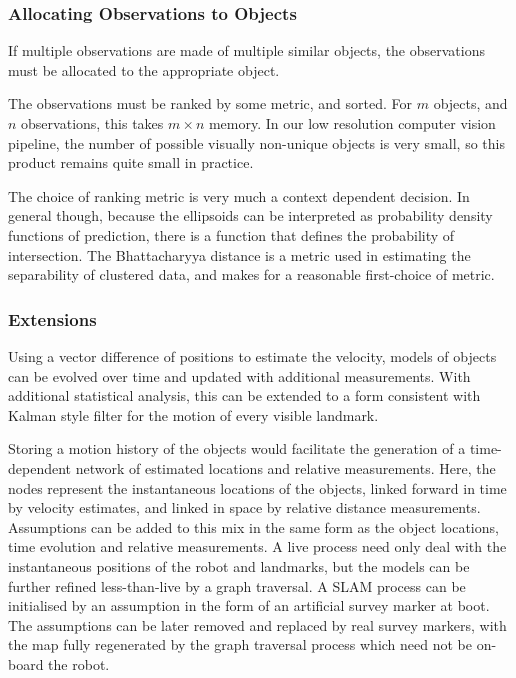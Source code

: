 \documentclass[a4paper, 11pt, titlepage]{article}
\begin{document}
    \subsubsection{Allocating Observations to Objects}
      If multiple observations are made of multiple similar objects, the observations must be allocated to the appropriate object.

      The observations must be ranked by some metric, and sorted.  For \(m\) objects, and \(n\) observations, this takes \(m \times n\) memory.  In our low resolution computer vision pipeline, the number of possible visually non-unique objects is very small, so this product remains quite small in practice.

      The choice of ranking metric is very much a context dependent decision.  In general though, because the ellipsoids can be interpreted as probability density functions of prediction, there is a function that defines the probability of intersection. The Bhattacharyya distance is a metric used in estimating the separability of clustered data, and makes for a reasonable first-choice of metric.

    \subsubsection{Extensions}
      Using a vector difference of positions to estimate the velocity, models of objects can be evolved over time and updated with additional measurements.  With additional statistical analysis, this can be extended to a form consistent with Kalman style filter for the motion of every visible landmark.

      Storing a motion history of the objects would facilitate the generation of a time-dependent network of estimated locations and relative measurements.
      Here, the nodes represent the instantaneous locations of the objects, linked forward in time by velocity estimates, and linked in space by relative distance measurements.  Assumptions can be added to this mix in the same form as the object locations, time evolution and relative measurements.  A live process need only deal with the instantaneous positions of the robot and landmarks, but the models can be further refined less-than-live by a graph traversal.
      A SLAM process can be initialised by an assumption in the form of an artificial survey marker at boot. The assumptions can be later removed and replaced by real survey markers, with the map fully regenerated by the graph traversal process which need not be on-board the robot.
      
\end{document}
